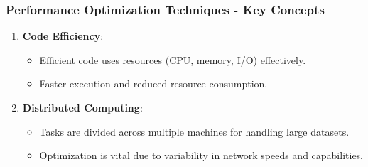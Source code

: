 \documentclass[aspectratio=169]{beamer}
\begin{document}
\begin{frame}[fragile]
    \frametitle{Performance Optimization Techniques - Key Concepts}
    \begin{enumerate}
        \item \textbf{Code Efficiency}:
        \begin{itemize}
            \item Efficient code uses resources (CPU, memory, I/O) effectively.
            \item Faster execution and reduced resource consumption.
        \end{itemize}

        \item \textbf{Distributed Computing}:
        \begin{itemize}
            \item Tasks are divided across multiple machines for handling large datasets.
            \item Optimization is vital due to variability in network speeds and capabilities.
        \end{itemize}
    \end{enumerate}
\end{frame}
\end{document}

